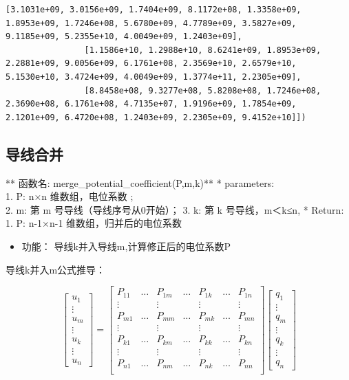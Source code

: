 \documentclass[11pt]{article}
\providecommand{\tightlist}{%
      \setlength{\itemsep}{0pt}\setlength{\parskip}{0pt}}
\begin{document}
\begin{Verbatim}[commandchars=\\\{\}]
                [3.1031e+09, 3.0156e+09, 1.7404e+09, 8.1172e+08, 1.3358e+09, 1.8953e+09, 1.7246e+08, 5.6780e+09, 4.7789e+09, 3.5827e+09, 9.1185e+09, 5.2355e+10, 4.0049e+09, 1.2403e+09],
                [1.1586e+10, 1.2988e+10, 8.6241e+09, 1.8953e+09, 2.2881e+09, 9.0056e+09, 6.1761e+08, 2.3569e+10, 2.6579e+10, 5.1530e+10, 3.4724e+09, 4.0049e+09, 1.3774e+11, 2.2305e+09],
                [8.8458e+08, 9.3277e+08, 5.8208e+08, 1.7246e+08, 2.3690e+08, 6.1761e+08, 4.7135e+07, 1.9196e+09, 1.7854e+09, 2.1201e+09, 6.4720e+08, 1.2403e+09, 2.2305e+09, 9.4152e+10]])
\end{Verbatim}
            
    \subsection{导线合并}\label{ux5bfcux7ebfux5408ux5e76}

    ** 函数名: merge\_potential\_coefficient(P,m,k)** * parameters:\\
1. P: n×n 维数组，电位系数 ;\\
2. m: 第 m 号导线（导线序号从0开始）； 3. k: 第 k 号导线，m＜k≤n, *
Return: 1. P: n-1×n-1 维数组，归并后的电位系数

\begin{itemize}
\tightlist
\item
  功能： 导线k并入导线m,计算修正后的电位系数P
\end{itemize}

导线k并入m公式推导：

\begin{equation} 
 \begin{bmatrix}
  u_1\\
  \vdots\\
  u_m\\
  \vdots\\
  u_k\\
  \vdots\\
  u_n
  \end{bmatrix} =
  \begin{bmatrix}
  P_{11}&\dots& P_{1m}&\dots&P_{1k}&\dots&P_{1n}\\
  \vdots& &\vdots& &\vdots& &\vdots\\
  P_{m1}&\dots& P_{mm}&\dots&P_{mk}&\dots&P_{mn}\\
   \vdots& &\vdots& &\vdots& &\vdots\\
    P_{k1}&\dots& P_{km}&\dots&P_{kk}&\dots&P_{kn}\\
   \vdots& &\vdots& &\vdots& &\vdots\\ 
    P_{n1}&\dots& P_{nm}&\dots&P_{nk}&\dots&P_{nn}\\
   \end{bmatrix}
   \begin{bmatrix}
   q_1\\
   \vdots\\
  q_m\\
  \vdots\\
  q_k\\
  \vdots\\
  q_n
 \end{bmatrix}
 \end{equation}
\end{document}
